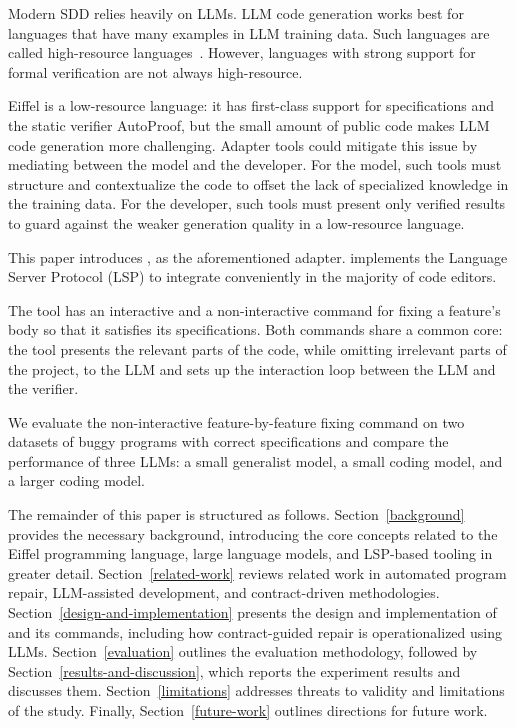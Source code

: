 \documentclass[runningheads]{llncs}
\newcommand{\secref}[1]{Section~\ref{#1}}
\begin{document}
Modern SDD relies heavily on LLMs. LLM code generation works best for languages
that have many examples in LLM training data. Such languages are called high-resource languages~\cite{joel2025surveyllmbasedcodegeneration}.
However, languages with strong support for formal verification are not always high-resource.

Eiffel is a low-resource language: it has first-class support for specifications and the static verifier AutoProof,
but the small amount of public code makes LLM code generation more challenging.
Adapter tools could mitigate this issue by mediating between the model and the developer.
For the model, such tools must structure and contextualize the code to offset the lack of specialized knowledge in the training data.
For the developer, such tools must present only verified results to guard against the weaker generation quality in a low-resource language.

This paper introduces \toolname{} \cite{eiffel-tools}, as the aforementioned adapter.
\toolname{} implements the Language Server Protocol (LSP) to integrate conveniently in the majority of code editors.

The tool has an interactive and a non-interactive command for fixing a feature's body
so that it satisfies its specifications. Both commands share a common core:
the tool presents the relevant parts of the code,
while omitting irrelevant parts of the project, to the LLM and sets up
the interaction loop between the LLM and the verifier.

We evaluate the non-interactive feature-by-feature fixing command on two datasets of buggy
programs with correct specifications and compare the performance of three LLMs:
a small generalist model, a small coding model, and a larger coding model.

The remainder of this paper is structured as follows. \secref{background} provides the necessary background, introducing the core concepts related to the Eiffel programming language, large language models, and LSP-based tooling in greater detail.
\secref{related-work} reviews related work in automated program repair, LLM-assisted development, and contract-driven methodologies.
\secref{design-and-implementation} presents the design and implementation of \toolname{} and its commands, including how contract-guided repair is operationalized using LLMs.
\secref{evaluation} outlines the evaluation methodology, followed by \secref{results-and-discussion}, which reports the experiment results and discusses them.
\secref{limitations} addresses threats to validity and limitations of the study.
Finally, \secref{future-work} outlines directions for future work.
\end{document}
